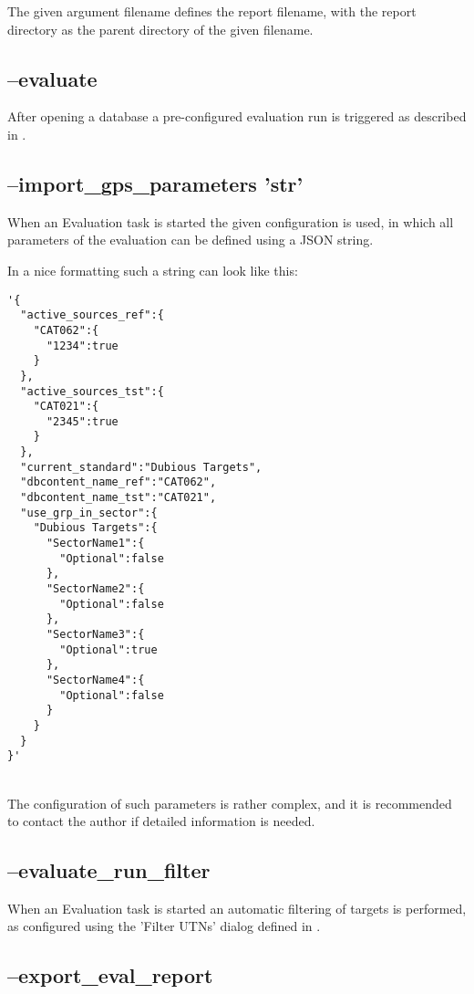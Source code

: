 The given argument filename defines the report filename, with the report directory as the parent directory of the given filename.

\subsection{--evaluate}

After opening a database a pre-configured evaluation run is triggered as described in .

\subsection{--import\_gps\_parameters 'str'}

When an Evaluation task is started the given configuration is used, in which all parameters of the evaluation can be defined using a JSON string.

In a nice formatting such a string can look like this:
\begin{lstlisting}[basicstyle=\small\ttfamily]
'{
  "active_sources_ref":{
    "CAT062":{
      "1234":true
    }
  },
  "active_sources_tst":{
    "CAT021":{
      "2345":true
    }
  },
  "current_standard":"Dubious Targets",
  "dbcontent_name_ref":"CAT062",
  "dbcontent_name_tst":"CAT021",
  "use_grp_in_sector":{
    "Dubious Targets":{
      "SectorName1":{
        "Optional":false
      },
      "SectorName2":{
        "Optional":false
      },
      "SectorName3":{
        "Optional":true
      },
      "SectorName4":{
        "Optional":false
      }
    }
  }
}'
\end{lstlisting}
\ \\

The configuration of such parameters is rather complex, and it is recommended to contact the author if detailed information is needed.

\subsection{--evaluate\_run\_filter}

When an Evaluation task is started an automatic filtering of targets is performed, as configured using the 'Filter UTNs' dialog defined in .


\subsection{--export\_eval\_report}

